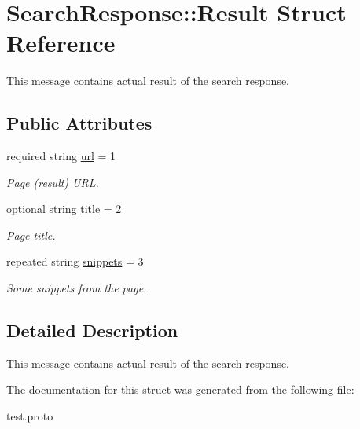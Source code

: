\hypertarget{structSearchResponse_1_1Result}{}\section{Search\+Response\+:\+:Result Struct Reference}
\label{structSearchResponse_1_1Result}


This message contains actual result of the search response.  


\subsection*{Public Attributes}
\begin{DoxyCompactItemize}
\item 
required string \hyperlink{structSearchResponse_1_1Result_ac306796c5c8062b2b375bb338bcd4463}{url} = 1\hypertarget{structSearchResponse_1_1Result_ac306796c5c8062b2b375bb338bcd4463}{}\label{structSearchResponse_1_1Result_ac306796c5c8062b2b375bb338bcd4463}

\begin{DoxyCompactList}\small\item\em Page (result) U\+RL. \end{DoxyCompactList}\item 
optional string \hyperlink{structSearchResponse_1_1Result_ab01f9494e16dabb1e3dc164ae639a1e5}{title} = 2\hypertarget{structSearchResponse_1_1Result_ab01f9494e16dabb1e3dc164ae639a1e5}{}\label{structSearchResponse_1_1Result_ab01f9494e16dabb1e3dc164ae639a1e5}

\begin{DoxyCompactList}\small\item\em Page title. \end{DoxyCompactList}\item 
repeated string \hyperlink{structSearchResponse_1_1Result_aff392bd803cfc088ea971994742a69ff}{snippets} = 3\hypertarget{structSearchResponse_1_1Result_aff392bd803cfc088ea971994742a69ff}{}\label{structSearchResponse_1_1Result_aff392bd803cfc088ea971994742a69ff}

\begin{DoxyCompactList}\small\item\em Some snippets from the page. \end{DoxyCompactList}\end{DoxyCompactItemize}


\subsection{Detailed Description}
This message contains actual result of the search response. 

The documentation for this struct was generated from the following file\+:\begin{DoxyCompactItemize}
\item 
test.\+proto\end{DoxyCompactItemize}
